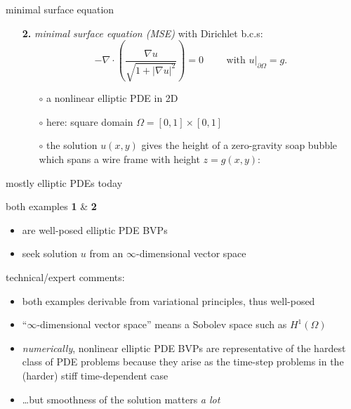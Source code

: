 \documentclass[hide notes,intlimits,usenames,dvipsnames]{beamer}
\newcommand{\grad}{\nabla}
\begin{document}
\begin{frame}{minimal surface equation}

\begin{itemize}
\item[\textbf{2.}] \emph{minimal surface equation (MSE)} with Dirichlet b.c.s:
	    $$- \grad\cdot \left(\frac{\grad u}{\sqrt{1 + |\grad u|^2}}\right) = 0  \qquad \text{ with } u\big|_{\partial \Omega} = g.$$
    \vspace{-2mm}
	\begin{itemize}
	\item[$\circ$] a nonlinear elliptic PDE in 2D
	\item[$\circ$] here: square domain $\Omega = [0,1] \times [0,1]$
	\item[$\circ$] the solution $u(x,y)$ gives the height of a zero-gravity soap bubble which spans a wire frame with height $z=g(x,y)$:
	\end{itemize}

\begin{center}
\end{center}
\end{itemize}
\end{frame}


\begin{frame}{mostly elliptic PDEs today}

both examples {\color{Blue} \textbf{1}} \& {\color{Blue} \textbf{2}}
\begin{itemize}
\item are well-posed elliptic PDE BVPs
\item seek solution $u$ from an \alert{$\infty$-dimensional vector space}
\end{itemize}

\bigskip\bigskip

\scriptsize
technical/expert comments:
\begin{itemize}
\item both examples derivable from variational principles, thus well-posed
\item ``$\infty$-dimensional vector space'' means a Sobolev space such as $H^1(\Omega)$
\item \emph{numerically}, nonlinear elliptic PDE BVPs are representative of the hardest class of PDE problems because they arise as the time-step problems in the (harder) stiff time-dependent case
\item \dots but smoothness of the solution matters \emph{a lot}
\end{itemize}
\end{frame}
\end{document}
